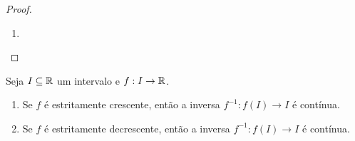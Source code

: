 \begin{proof}
\begin{enumerate}[leftmargin=*, align=left, label=\textbf{(\alph*)}]
                \begin{claim}
                    Sejam $a,b \in I$ tais que $a<b$.
                        \begin{enumerate}[label=\roman*.]
                            \item Se $f(a) < f(b)$, então $f$ é estritamente crescente.
                            \item Se $f(b) < f(a)$, então $f$ é estritamente decrescente.
                        \end{enumerate}
                \end{claim}
                \begin{midproof}
                    Sejam $x_1, x_2 \in I \setminus \{a,b\}$ tais que $x_1 < x_2$. Temos 6 casos a considerar.
                        \begin{itemize}
                            \item $x_1 < x_2 < a < b$.
                            \item $x_1 < a < x_2 < b$.
                            \item $x_1 < a < b < x_2$.
                            \item $a < b < x_1 < x_2$.
                            \item $a < x_1 < b < x_2$.
                            \item $a < x_1 < x_2 < b$.
                        \end{itemize}
                    Em qualquer um dos casos acima, o sinal de $f(x_2) - f(x_1)$ concorda com o de $f(b) - f(a)$. De fato, se $f(a) < f(b)$, então, pela afirmação anterior, $f(x_1) < f(x_2)$, donde $f$ é estritamente crescente. Analogamente, se $f(a) > f(b)$, então, pela afirmação anterior, $f(x_1) > f(x_2)$, donde $f$ é estritamente decrescente. Por fim, se $x_1 \in \{a,b \}$ ou $x_2 \in \{a,b \}$, o resultado segue diretamente da primeira afirmação. \whiteproof
                \end{midproof}
            Logo, $f$ é estritamente monótona. \blackproof
            \item \blackproof
        \end{enumerate}
\end{proof}

\begin{theorem} \label{teo.calc1:continuidade_da_inversa}
    Seja $I \subseteq \mathbb{R}$ um intervalo e $f : I  \to \mathbb{R}$. 
        \begin{enumerate}[leftmargin=*, align=left, label=\textbf{(\alph*)}]
            \item Se $f$ é estritamente crescente, então a inversa $f^{-1} : f(I) \to I$ é contínua.
            \item Se $f$ é estritamente decrescente, então a inversa $f^{-1} : f(I) \to I$ é contínua.
        \end{enumerate}
\end{theorem}

